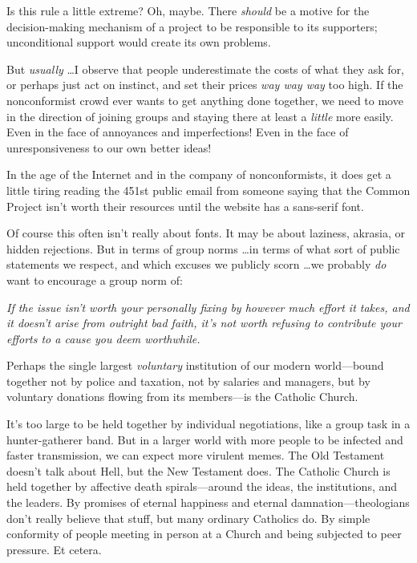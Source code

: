 {
 Is this rule a little extreme? Oh, maybe. There \textit{should} be
a motive for the decision-making mechanism of a project to be
responsible to its supporters; unconditional support would create its
own problems.}

{
 But \textit{usually} \ldots I observe that people underestimate the
costs of what they ask for, or perhaps just act on instinct, and set
their prices \textit{way way way} too high. If the nonconformist crowd
ever wants to get anything done together, we need to move in the
direction of joining groups and staying there at least a
\textit{little} more easily. Even in the face of annoyances and
imperfections! Even in the face of unresponsiveness to our own better
ideas!}

{
 In the age of the Internet and in the company of nonconformists,
it does get a little tiring reading the 451st public email from someone
saying that the Common Project isn't worth their
resources until the website has a sans-serif font.}

{
 Of course this often isn't really about fonts. It
may be about laziness, akrasia, or hidden rejections. But in terms of
group norms \ldots in terms of what sort of public statements we
respect, and which excuses we publicly scorn \ldots we probably
\textit{do} want to encourage a group norm of:}

{
 \textit{If the issue isn't worth your personally
fixing by however much effort it takes, and it doesn't
arise from outright bad faith, it's not worth refusing
to contribute your efforts to a cause you deem worthwhile.}}

\myendsectiontext


{
 Perhaps the single largest \textit{voluntary} institution of our
modern world---bound together not by police and taxation, not by
salaries and managers, but by voluntary donations flowing from its
members---is the Catholic Church. }

{
 It's too large to be held together by individual
negotiations, like a group task in a hunter-gatherer band. But in a
larger world with more people to be infected and faster transmission,
we can expect more virulent memes. The Old Testament
doesn't talk about Hell, but the New Testament does.
The Catholic Church is held together by affective death
spirals---around the ideas, the institutions, and the leaders. By
promises of eternal happiness and eternal damnation---theologians
don't really believe that stuff, but many ordinary
Catholics do. By simple conformity of people meeting in person at a
Church and being subjected to peer pressure. Et cetera.}

